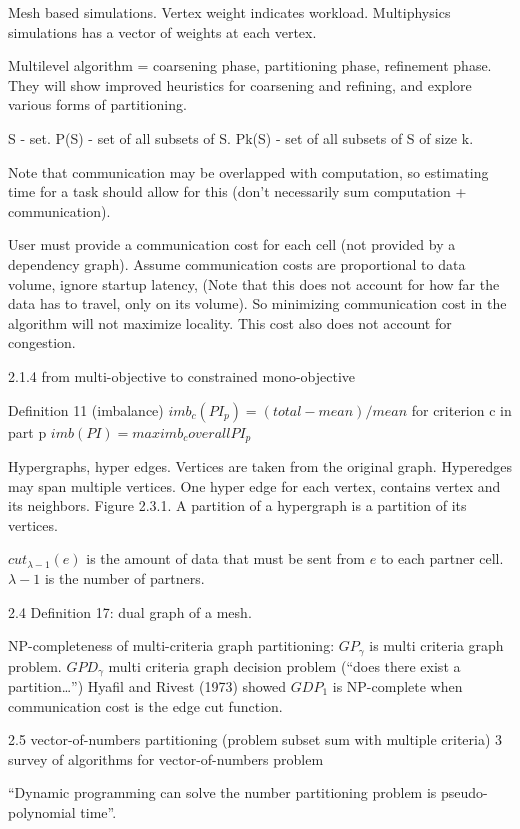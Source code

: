 \documentclass{article}
\begin{document}
Mesh based simulations.
Vertex weight indicates workload.
Multiphysics simulations has a vector of weights at each vertex.

Multilevel algorithm = coarsening phase, partitioning phase, refinement phase.
They will show improved heuristics for coarsening and refining, and explore various forms of partitioning.

S - set.
P(S) - set of all subsets of S.
Pk(S) - set of all subsets of S of size k.

Note that communication may be overlapped with computation, so estimating time for a task should allow for this (don’t necessarily sum computation + communication).

User must provide a communication cost for each cell (not provided by a dependency graph).
Assume communication costs are proportional to data volume, ignore startup latency,
(Note that this does not account for how far the data has to travel, only on its volume).
So minimizing communication cost in the algorithm will not maximize locality.  This cost also does not account for congestion.

2.1.4 from multi-objective to constrained mono-objective

Definition 11 (imbalance)
$imb_c(PI_p) = (total - mean) / mean$        for criterion c in part p
$imb(PI) = max imb_c over all PI_p$

Hypergraphs, hyper edges.
Vertices are taken from the original graph.  Hyperedges may span multiple vertices.
One hyper edge for each vertex, contains vertex and its neighbors.  Figure 2.3.1.
A partition of a hypergraph is a partition of its vertices.

$cut_{\lambda-1}(e)$ is the amount of data that must be sent from $e$ to each partner cell.
$\lambda-1$ is the number of partners.

2.4
Definition 17: dual graph of a mesh.

NP-completeness of multi-criteria graph partitioning:
$GP_\gamma$ is multi criteria graph problem.
$GPD_\gamma$ multi criteria graph decision problem (“does there exist a partition…”)
Hyafil and Rivest (1973) showed $GDP_1$ is NP-complete when communication cost is the edge cut function.

2.5 vector-of-numbers partitioning (problem subset sum with multiple criteria)
3 survey of algorithms for vector-of-numbers problem

“Dynamic programming can solve the number partitioning problem is pseudo-polynomial time”.
\end{document}
